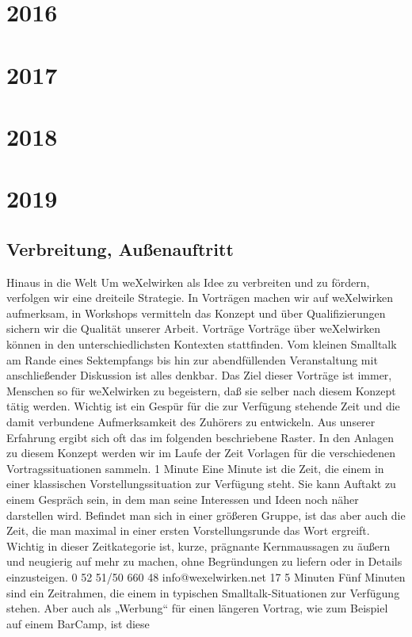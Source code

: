   \section{2016}
  \section{2017}
  \section{2018}
  \section{2019}
\subsection{Verbreitung, Außenauftritt}
Hinaus in die Welt
Um weXelwirken als Idee zu verbreiten und zu fördern, verfolgen wir eine dreiteile Strategie. In 
Vorträgen machen wir auf weXelwirken aufmerksam, in Workshops vermitteln das Konzept und über 
Qualifizierungen sichern wir die Qualität unserer Arbeit.
Vorträge
Vorträge über weXelwirken können in den unterschiedlichsten Kontexten stattfinden. Vom kleinen 
Smalltalk am Rande eines Sektempfangs bis hin zur abendfüllenden Veranstaltung mit anschließender 
Diskussion ist alles denkbar. Das Ziel dieser Vorträge ist immer, Menschen so für weXelwirken zu 
begeistern, daß sie selber nach diesem Konzept tätig werden. Wichtig ist ein Gespür für die zur 
Verfügung stehende Zeit und die damit verbundene Aufmerksamkeit des Zuhörers zu entwickeln. Aus 
unserer Erfahrung ergibt sich oft das im folgenden beschriebene Raster. In den Anlagen zu diesem 
Konzept werden wir im Laufe der Zeit Vorlagen für die verschiedenen Vortragssituationen sammeln.
1 Minute
Eine Minute ist die Zeit, die einem in einer klassischen Vorstellungssituation zur Verfügung steht. Sie 
kann Auftakt zu einem Gespräch sein, in dem man seine Interessen und Ideen noch näher darstellen 
wird. Befindet man sich in einer größeren Gruppe, ist das aber auch die Zeit, die man maximal in einer 
ersten Vorstellungsrunde das Wort ergreift.
Wichtig in dieser Zeitkategorie ist, kurze, prägnante Kernmaussagen zu äußern und neugierig auf mehr 
zu machen, ohne Begründungen zu liefern oder in Details einzusteigen. 
0 52 51/50 660 48
info@wexelwirken.net
17
5 Minuten
Fünf Minuten sind ein Zeitrahmen, die einem in typischen Smalltalk-Situationen zur Verfügung stehen. 
Aber auch als „Werbung“ für einen längeren Vortrag, wie zum Beispiel auf einem BarCamp, ist diese 
